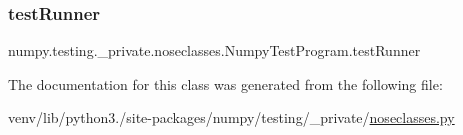 \subsubsection{\texorpdfstring{test\+Runner}{testRunner}}
{\footnotesize\ttfamily numpy.\+testing.\+\_\+private.\+noseclasses.\+Numpy\+Test\+Program.\+test\+Runner}



The documentation for this class was generated from the following file\+:\begin{DoxyCompactItemize}
\item 
venv/lib/python3./site-\/packages/numpy/testing/\+\_\+private/\hyperlink{noseclasses_8py}{noseclasses.\+py}\end{DoxyCompactItemize}
